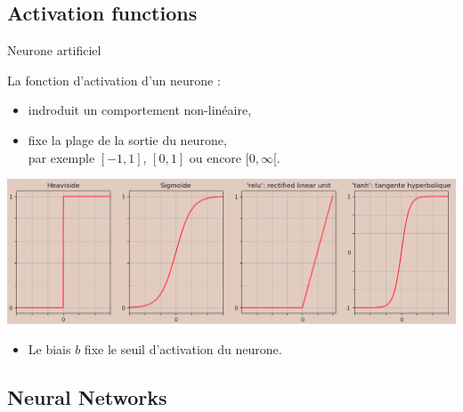 \documentclass[10pt,serif,mathserif,compress,hyperref={colorlinks}]{beamer}
\begin{document}

\subsection{Activation functions}

\begin{frame}{Neurone artificiel}

  La fonction d'activation d'un neurone :
  \begin{itemize}
  \item indroduit un comportement non-linéaire,
  \item fixe la plage de la sortie du neurone,\\
    par exemple $[-1, 1]$, $[0, 1]$ ou encore $[0, \infty[$.
  \end{itemize}    

  \begin{tcolorbox}[title={\small Exemples de fonctions d'activation souvent utilisées}]
    \includegraphics[width=\textwidth]{images/activ_functions-2.png}
  \end{tcolorbox}

  \begin{itemize}
  \item Le biais $b$ fixe le seuil d'activation du neurone.
  \end{itemize}    
   
\end{frame}

\subsection{Neural Networks}
\end{document}
